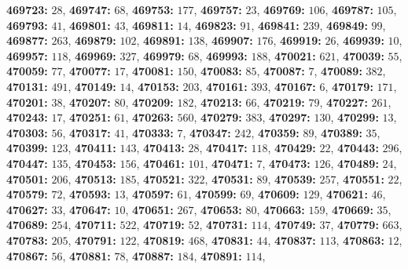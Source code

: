\textsf{\bfseries 469723:} $28$, \textsf{\bfseries 469747:} $68$, \textsf{\bfseries 469753:} $177$, \textsf{\bfseries 469757:} $23$, \textsf{\bfseries 469769:} $106$, \textsf{\bfseries 469787:} $105$, \textsf{\bfseries 469793:} $41$, \textsf{\bfseries 469801:} $43$, \textsf{\bfseries 469811:} $14$, \textsf{\bfseries 469823:} $91$, \textsf{\bfseries 469841:} $239$, \textsf{\bfseries 469849:} $99$, \textsf{\bfseries 469877:} $263$, \textsf{\bfseries 469879:} $102$, \textsf{\bfseries 469891:} $138$, \textsf{\bfseries 469907:} $176$, \textsf{\bfseries 469919:} $26$, \textsf{\bfseries 469939:} $10$, \textsf{\bfseries 469957:} $118$, \textsf{\bfseries 469969:} $327$, \textsf{\bfseries 469979:} $68$, \textsf{\bfseries 469993:} $188$, \textsf{\bfseries 470021:} $621$, \textsf{\bfseries 470039:} $55$, \textsf{\bfseries 470059:} $77$, \textsf{\bfseries 470077:} $17$, \textsf{\bfseries 470081:} $150$, \textsf{\bfseries 470083:} $85$, \textsf{\bfseries 470087:} $7$, \textsf{\bfseries 470089:} $382$, \textsf{\bfseries 470131:} $491$, \textsf{\bfseries 470149:} $14$, \textsf{\bfseries 470153:} $203$, \textsf{\bfseries 470161:} $393$, \textsf{\bfseries 470167:} $6$, \textsf{\bfseries 470179:} $171$, \textsf{\bfseries 470201:} $38$, \textsf{\bfseries 470207:} $80$, \textsf{\bfseries 470209:} $182$, \textsf{\bfseries 470213:} $66$, \textsf{\bfseries 470219:} $79$, \textsf{\bfseries 470227:} $261$, \textsf{\bfseries 470243:} $17$, \textsf{\bfseries 470251:} $61$, \textsf{\bfseries 470263:} $560$, \textsf{\bfseries 470279:} $383$, \textsf{\bfseries 470297:} $130$, \textsf{\bfseries 470299:} $13$, \textsf{\bfseries 470303:} $56$, \textsf{\bfseries 470317:} $41$, \textsf{\bfseries 470333:} $7$, \textsf{\bfseries 470347:} $242$, \textsf{\bfseries 470359:} $89$, \textsf{\bfseries 470389:} $35$, \textsf{\bfseries 470399:} $123$, \textsf{\bfseries 470411:} $143$, \textsf{\bfseries 470413:} $28$, \textsf{\bfseries 470417:} $118$, \textsf{\bfseries 470429:} $22$, \textsf{\bfseries 470443:} $296$, \textsf{\bfseries 470447:} $135$, \textsf{\bfseries 470453:} $156$, \textsf{\bfseries 470461:} $101$, \textsf{\bfseries 470471:} $7$, \textsf{\bfseries 470473:} $126$, \textsf{\bfseries 470489:} $24$, \textsf{\bfseries 470501:} $206$, \textsf{\bfseries 470513:} $185$, \textsf{\bfseries 470521:} $322$, \textsf{\bfseries 470531:} $89$, \textsf{\bfseries 470539:} $257$, \textsf{\bfseries 470551:} $22$, \textsf{\bfseries 470579:} $72$, \textsf{\bfseries 470593:} $13$, \textsf{\bfseries 470597:} $61$, \textsf{\bfseries 470599:} $69$, \textsf{\bfseries 470609:} $129$, \textsf{\bfseries 470621:} $46$, \textsf{\bfseries 470627:} $33$, \textsf{\bfseries 470647:} $10$, \textsf{\bfseries 470651:} $267$, \textsf{\bfseries 470653:} $80$, \textsf{\bfseries 470663:} $159$, \textsf{\bfseries 470669:} $35$, \textsf{\bfseries 470689:} $254$, \textsf{\bfseries 470711:} $522$, \textsf{\bfseries 470719:} $52$, \textsf{\bfseries 470731:} $114$, \textsf{\bfseries 470749:} $37$, \textsf{\bfseries 470779:} $663$, \textsf{\bfseries 470783:} $205$, \textsf{\bfseries 470791:} $122$, \textsf{\bfseries 470819:} $468$, \textsf{\bfseries 470831:} $44$, \textsf{\bfseries 470837:} $113$, \textsf{\bfseries 470863:} $12$, \textsf{\bfseries 470867:} $56$, \textsf{\bfseries 470881:} $78$, \textsf{\bfseries 470887:} $184$, \textsf{\bfseries 470891:} $114$, 
